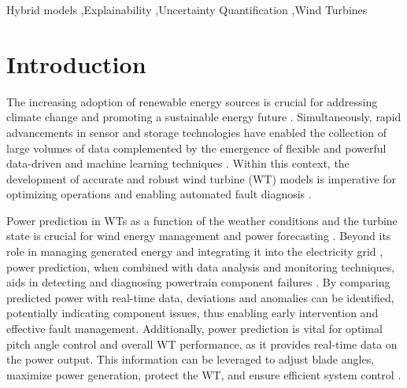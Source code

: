 \documentclass[preprint,12pt]{elsarticle}
\begin{document}
\begin{frontmatter}
\begin{keyword}
Hybrid models \sep Explainability \sep Uncertainty Quantification \sep Wind Turbines
\end{keyword}

\end{frontmatter}


\section{Introduction}\label{sec:introduction}

The increasing adoption of renewable energy sources is crucial for addressing climate change and promoting a sustainable energy future \cite{IRENA}. Simultaneously, rapid advancements in sensor and storage technologies have enabled the collection of large volumes of data complemented by the emergence of flexible and powerful data-driven and machine learning techniques \cite{Wu2016,Yao2023}. Within this context, the development of accurate and robust wind turbine (WT) models is imperative for optimizing operations \cite{munteanu2008optimal} and enabling automated fault diagnosis \cite{Bindingsbo2023}.

Power prediction in WTs as a function of the weather conditions and the turbine state is crucial for wind energy management and power forecasting \cite{Mehrjoo2019}. Beyond its role in managing generated energy and integrating it into the electricity grid \cite{Watson1994}, power prediction, when combined with data analysis and monitoring techniques, aids in detecting and diagnosing powertrain component failures \cite{Benbouzid2021}. By comparing predicted power with real-time data, deviations and anomalies can be identified, potentially indicating component issues, thus enabling early intervention and effective fault management. Additionally, power prediction is vital for optimal pitch angle control and overall WT performance, as it provides real-time data on the power output. This information can be leveraged to adjust blade angles, maximize power generation, protect the WT, and ensure efficient system control \cite{APATA2020}.
\end{document}
